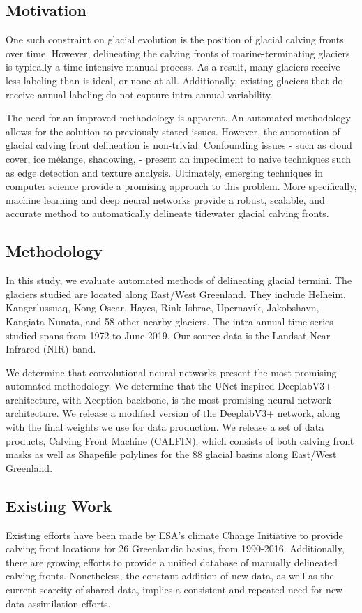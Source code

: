 \documentclass[tc, manuscript]{copernicus}
\begin{document}
\subsection{Motivation}
One such constraint on glacial evolution is the position of glacial calving fronts over time. However, delineating the calving fronts of marine-terminating glaciers is typically a time-intensive manual process. As a result, many glaciers receive less labeling than is ideal, or none at all. Additionally, existing glaciers that do receive annual labeling do not capture intra-annual variability. 

The need for an improved methodology is apparent. An automated methodology allows for the solution to previously stated issues. However, the automation of glacial calving front delineation is non-trivial. Confounding issues - such as cloud cover, ice mélange, shadowing,  - present an impediment to naive techniques such as edge detection and texture analysis. Ultimately, emerging techniques in computer science provide a promising approach to this problem. More specifically, machine learning and deep neural networks provide a robust, scalable, and accurate method to automatically delineate tidewater glacial calving fronts.

\subsection{Methodology}
In this study, we evaluate automated methods of delineating glacial termini. The glaciers studied are located along East/West Greenland. They include Helheim, Kangerlussuaq, Kong Oscar, Hayes, Rink Isbrae, Upernavik, Jakobshavn, Kangiata Nunata, and 58 other nearby glaciers. The intra-annual time series studied spans from 1972 to June 2019. Our source data is the Landsat Near Infrared (NIR) band.

We determine that convolutional neural networks present the most promising automated methodology. We determine that the UNet-inspired DeeplabV3+ architecture, with Xception backbone, is the most promising neural network architecture. We release a modified version of the DeeplabV3+ network, along with the final weights we use for data production. We release a set of data products, Calving Front Machine (CALFIN), which consists of both calving front masks as well as Shapefile polylines for the 88 glacial basins along East/West Greenland.

\subsection{Existing Work}
Existing efforts have been made by ESA's climate Change Initiative to provide calving front locations for 26 Greenlandic basins, from 1990-2016\cite{esa-cci-cfl}. Additionally, there are growing efforts to provide a unified database of manually delineated calving fronts. Nonetheless, the constant addition of new data, as well as the current scarcity of shared data, implies a consistent and repeated need for new data assimilation efforts.
\end{document}
